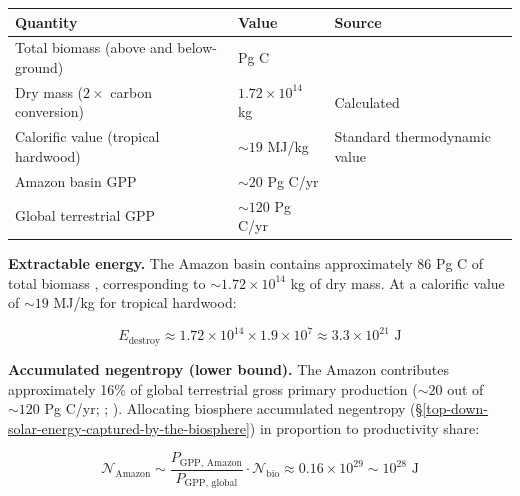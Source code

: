 \documentclass[11pt]{article}
\theoremstyle{plain}
\theoremstyle{definition}
\theoremstyle{remark}
\newcounter{none}
\begin{document}
{\def\LTcaptype{none} %
\begin{longtable}[]{@{}
  >{\raggedright\arraybackslash}p{}
  >{\raggedright\arraybackslash}p{}
  >{\raggedright\arraybackslash}p{}@{}}
\toprule\noalign{}
\begin{minipage}[b]{\linewidth}\raggedright
Quantity
\end{minipage} & \begin{minipage}[b]{\linewidth}\raggedright
Value
\end{minipage} & \begin{minipage}[b]{\linewidth}\raggedright
Source
\end{minipage} \\
\midrule\noalign{}
\endhead
\bottomrule\noalign{}
\endlastfoot
Total biomass (above and below-ground) & 86 Pg C &
\citet{Saatchi2007} \\
Dry mass (\(2\times\) carbon conversion) & \(1.72 \times 10^{14}\) kg &
Calculated \\
Calorific value (tropical hardwood) & \(\sim 19\) MJ/kg & Standard
thermodynamic value \\
Amazon basin GPP & \(\sim 20\) Pg C/yr &
\citet{SciencePanelAmazon2021} \\
Global terrestrial GPP & \(\sim 120\) Pg C/yr & \citet{Beer2010} \\
\end{longtable}
}

\textbf{Extractable energy.} The Amazon basin contains approximately 86
Pg C of total biomass \citep{Saatchi2007}, corresponding to
\(\sim 1.72 \times 10^{14}\) kg of dry mass. At a calorific value of
\(\sim 19\) MJ/kg for tropical hardwood:

\[E_{\text{destroy}} \approx 1.72 \times 10^{14} \times 1.9 \times 10^{7} \approx 3.3 \times 10^{21} \text{ J}\]

\textbf{Accumulated negentropy (lower bound).} The Amazon contributes
approximately 16\% of global terrestrial gross primary production
(\(\sim 20\) out of \(\sim 120\) Pg C/yr;
\citet{SciencePanelAmazon2021}; \citet{Beer2010}). Allocating biosphere
accumulated negentropy
(§\ref{top-down-solar-energy-captured-by-the-biosphere}) in proportion
to productivity share:

\[\mathcal{N}_{\text{Amazon}} \sim \frac{P_{\text{GPP, Amazon}}}{P_{\text{GPP, global}}} \cdot \mathcal{N}_{\text{bio}} \approx 0.16 \times 10^{29} \sim 10^{28} \text{ J}\]
\end{document}
